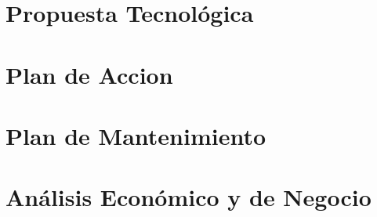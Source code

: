 \documentclass[12pt,letterpaper]{article}
\begin{document}
	
	
	
	

	
	




\part{Propuesta Tecnológica}\label{propuesta-tecno}
	


\part{Plan de Accion}\label{plan-accion}
	


\part{Plan de Mantenimiento}\label{plan-mantenimiento}
	


\part{Análisis Económico y de Negocio}\label{analisis-economico}
	
	
	
	
	


%	

 
\end{document}
